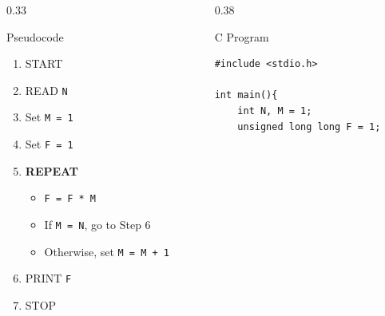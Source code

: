 \documentclass[aspectratio=169]{beamer}
\begin{document}
	\begin{frame}{}
		
		\vspace*{-0.50cm}
		
		\begin{columns}[T,onlytextwidth]
			
			
			\begin{column}{0.33\textwidth}
				
				\begin{block}{Pseudocode}
					\scriptsize
					\begin{enumerate}
						\item START
						\item READ \texttt{N}
						\item Set \texttt{M = 1}
						\item Set \texttt{F = 1}
						\item
						\textbf{REPEAT}
						\begin{itemize}\scriptsize
							\item \texttt{F = F * M}
							\item If \texttt{M = N}, go to Step 6
							\item Otherwise, set \texttt{M = M + 1}
						\end{itemize}
						\item PRINT \texttt{F}
						\item STOP
					\end{enumerate}
				\end{block}
				
			\end{column}
			
			
			\hspace*{0.5cm}
			\begin{column}{0.38\textwidth}
				
				\begin{block}{C Program}
					
\begin{lstlisting}[style=cstyle,numbers=none]
#include <stdio.h>

int main(){
	int N, M = 1;
	unsigned long long F = 1;
	

\end{lstlisting}
\end{block}
\end{column}
\end{columns}
\end{frame}
\end{document}
